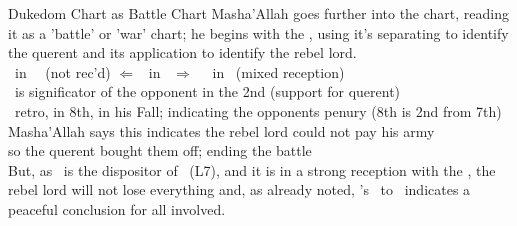 \begin{frame}[t]{Dukedom Chart as Battle Chart}
Masha'Allah goes further into the chart, reading it as a 'battle' or 'war' chart; he begins with the \Moon, using it's separating to identify the querent and its application to identify the rebel lord. \\
\vspace{0.25cm}
\Jupiter\ in \Virgo\ \Trine\ (not rec'd) $\Leftarrow$ \Moon\ in \Capricorn\ $\Rightarrow$ \Opposition\ \Mars\ in \Cancer\ (mixed reception) \\
\hspace{1em}\Moon\ is significator of the opponent  in the 2nd (support for querent) \\
\hspace{1em}\Mars\ retro, in 8th, in his Fall; indicating the opponents penury (8th is 2nd from 7th) \\
\hspace{1em} Masha'Allah says this indicates the rebel lord could not pay his army \\
\hspace{1em} so the querent bought them off; ending the battle \\
\vspace{0.25cm}
But, as \Mars\ is the dispositor of \Mercury\ (L7), and it is in a strong reception with the \Moon, the rebel lord will not lose everything and, as already noted, \Mercury's \Sextile\ to \Jupiter\ indicates a peaceful conclusion for all involved.



\end{frame}